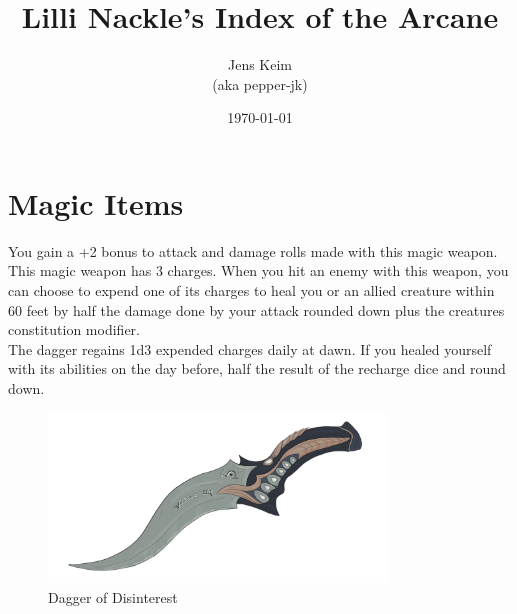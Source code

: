 \documentclass[letter,10pt,twocolumn,openany]{dndbook}
\title{Lilli Nackle’s Index of the Arcane}
\author{Jens Keim\\(aka pepper-jk)}
\date{\today}
\begin{document}
\frontmatter

\maketitle

\tableofcontents

\mainmatter

\chapter{Magic Items}

You gain a +2 bonus to attack and damage rolls made with this magic weapon.\\

This magic weapon has 3 charges. When you hit an enemy with this weapon, you can choose to expend one of its charges to heal you or an allied creature within 60 feet by half the damage done by your attack rounded down plus the creatures constitution modifier.\\
The dagger regains 1d3 expended charges daily at dawn. If you healed yourself with its abilities on the day before, half the result of the recharge dice and round down.\\


\begin{figure}
    \includegraphics[width=9cm]{images/dagger_of_disinterest.png}
    \caption{Dagger of Disinterest}
\end{figure}
\end{document}
